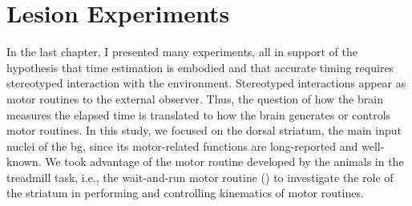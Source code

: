 \chapter{Lesion Experiments} \label{ch:lesion}
In the last chapter, I presented many experiments, all in support of the hypothesis that time estimation is embodied and that accurate timing requires stereotyped interaction with the environment.
Stereotyped interactions appear as motor routines to the external observer.
Thus, the question of how the brain measures the elapsed time is translated to how the brain generates or controls motor routines.
In this study, we focused on the dorsal striatum, the main input nuclei of the \gls{bg}, since its motor-related functions are long-reported and well-known.
We took advantage of the motor routine developed by the animals in the treadmill task, i.e., the wait-and-run motor routine () to investigate the role of the striatum in performing and controlling kinematics of motor routines.

